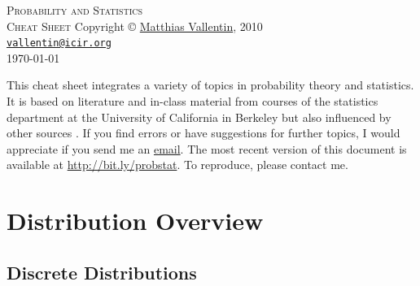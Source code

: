 \documentclass[landscape]{article}
\makeatletter
\def\email{\texttt{\href{mailto:vallentin@icir.org}{vallentin@icir.org}}}
\def\web{\url{http://bit.ly/probstat}}
\makeatother
\begin{document}
\thispagestyle{empty}
\begin{center}
  \vspace*{\fill}
  \textsc{\Huge Probability and Statistics\\[2ex] \huge Cheat Sheet}
  \vfill
  \footnotesize{
  Copyright \copyright{} 
  \href{http://matthias.vallentin.net}{Matthias Vallentin}, 2010\\
    \email\\[2ex]
    \today
  }
\end{center}

\newpage

\thispagestyle{empty}
\begin{multicols*}{3}
  {\footnotesize
  This cheat sheet integrates a variety of topics in probability theory and
  statistics. It is based on literature \cite{Hoel72,Wasserman03,Shumway06} and
  in-class material from courses of the statistics department at the University
  of California in Berkeley but also influenced by other sources
  \cite{Steger01,Steger02}. If you find errors or have suggestions for further
  topics, I would appreciate if you send me an
  \href{mailto:vallentin@icir.org}{email}. The most recent version of this
  document is available at \web. To reproduce, please contact me.}
  \tableofcontents

\end{multicols*}
\newpage

\section{Distribution Overview}

\subsection{Discrete Distributions}
\end{document}
